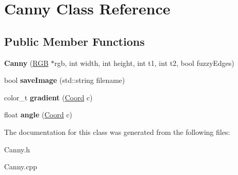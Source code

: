 \hypertarget{class_canny}{\section{Canny Class Reference}
\label{class_canny}
}
\subsection*{Public Member Functions}
\begin{DoxyCompactItemize}
\item 
\hypertarget{class_canny_a1ad410465ac8ce1297e2b2da3af251a4}{{\bfseries Canny} (\hyperlink{struct_r_g_b}{R\-G\-B} $\ast$rgb, int width, int height, int t1, int t2, bool fuzzy\-Edges)}\label{class_canny_a1ad410465ac8ce1297e2b2da3af251a4}

\item 
\hypertarget{class_canny_ae55fb997a745394d6a458ff2614d96bc}{bool {\bfseries save\-Image} (std\-::string filename)}\label{class_canny_ae55fb997a745394d6a458ff2614d96bc}

\item 
\hypertarget{class_canny_a8ed16206ee4a1e2b83bc044c6ea44edf}{color\-\_\-t {\bfseries gradient} (\hyperlink{struct_coord}{Coord} c)}\label{class_canny_a8ed16206ee4a1e2b83bc044c6ea44edf}

\item 
\hypertarget{class_canny_ad772d59de68ce90791123e51f32b76d8}{float {\bfseries angle} (\hyperlink{struct_coord}{Coord} c)}\label{class_canny_ad772d59de68ce90791123e51f32b76d8}

\end{DoxyCompactItemize}


The documentation for this class was generated from the following files\-:\begin{DoxyCompactItemize}
\item 
Canny.\-h\item 
Canny.\-cpp\end{DoxyCompactItemize}
